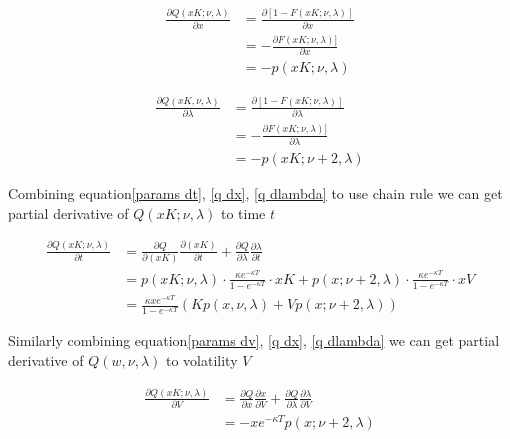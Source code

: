 \begin{equation}\label{q dx}
    \begin{aligned}
        \frac{\partial Q(xK; \nu, \lambda)}{\partial x}&=\frac{\partial[1-F(xK; \nu, \lambda)]}{\partial x} \\ 
        &=-\frac{\partial F(xK; \nu, \lambda)]}{\partial x} \\
        &=-p(xK; \nu, \lambda)
        \end{aligned}
\end{equation}

\begin{equation}\label{q dlambda}
    \begin{aligned}
        \frac{\partial Q(xK, \nu, \lambda)}{\partial \lambda}&=\frac{\partial[1-F(xK ; \nu, \lambda)]}{\partial \lambda}\\
        &=-\frac{\partial F(xK ; \nu, \lambda)]}{\partial \lambda} \\
        &=-p(xK ; \nu+2, \lambda)
    \end{aligned}
\end{equation}

Combining equation\eqref{params dt}, \eqref{q dx}, \eqref{q dlambda} to use chain rule we can get partial derivative of $Q(xK; \nu, \lambda)$ to time $t$

\begin{equation}\label{q dt}
    \begin{aligned}
        \frac{\partial Q(xK; \nu, \lambda)}{\partial t}&= \frac{\partial Q}{\partial (xK)}\frac{\partial (xK)}{\partial t} + \frac{\partial Q}{\partial \lambda} \frac{\partial \lambda}{\partial t} \\
        &= p(xK; \nu, \lambda) \cdot \frac{\kappa e^{-\kappa T}}{1 - e^{-\kappa T}}\cdot xK + p(x ; \nu+2, \lambda) \cdot\frac{\kappa e^{-\kappa T}}{1 - e^{-\kappa T}}\cdot x V \\
        &= \frac{\kappa x e^{-\kappa T}}{1 - e^{-\kappa T}} \left( K p(x, \nu, \lambda)  + V p(x ; \nu+2, \lambda)\right)
    \end{aligned}
\end{equation}

\noindent Similarly combining equation\eqref{params dv}, \eqref{q dx}, \eqref{q dlambda} we can get partial derivative of $Q(w, \nu, \lambda)$ to volatility $V$

\begin{equation}\label{q dv}
    \begin{aligned}
        \frac{\partial Q(xK; \nu, \lambda)}{\partial V}&= \frac{\partial Q}{\partial x}\frac{\partial x}{\partial V} + \frac{\partial Q}{\partial \lambda} \frac{\partial \lambda}{\partial V} \\
        &= - x e^{-\kappa T} p(x ; \nu+2, \lambda)
    \end{aligned}
\end{equation}

